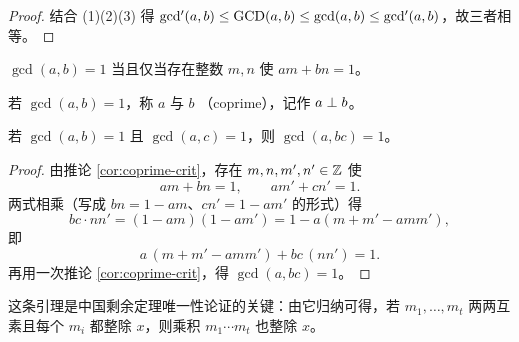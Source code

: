 \begin{proof}
结合 (1)(2)(3) 得
$\mathop{\mathrm{gcd'}}\nolimits(a,b)\le\mathrm{GCD}(a,b)\le\gcd(a,b)\le\mathop{\mathrm{gcd'}}\nolimits(a,b)$，故三者相等。
\end{proof}

\begin{corollary}[互素判据]\label{cor:coprime-crit}
$\gcd(a,b)=1$ 当且仅当存在整数 $m,n$ 使 $am+bn=1$。
\end{corollary}

\begin{definition}[互素]
若 $\gcd(a,b)=1$，称 $a$ 与 $b$ （coprime），记作 $a\perp b$。
\end{definition}

\begin{lemma}[互素的乘积封闭性]\label{lem:cop-product}
若 $\gcd(a,b)=1$ 且 $\gcd(a,c)=1$，则 $\gcd(a,bc)=1$。
\end{lemma}

\begin{proof}
由推论 \ref{cor:coprime-crit}，存在 $m,n,m',n'\in\mathbb{Z}$ 使
\[
  am+bn=1,\qquad am'+cn'=1.
\]
两式相乘（写成 $bn=1-am$、$cn'=1-am'$ 的形式）得
\[
  bc\cdot nn'=(1-am)(1-am')=1-a(m+m'-amm'),
\]
即
\[
  a\,(m+m'-amm')+bc\,(nn')=1.
\]
再用一次推论 \ref{cor:coprime-crit}，得 $\gcd(a,bc)=1$。
\end{proof}

\begin{remark}
这条引理是中国剩余定理唯一性论证的关键：由它归纳可得，若
$m_1,\ldots,m_t$ 两两互素且每个 $m_i$ 都整除 $x$，则乘积
$m_1\cdots m_t$ 也整除 $x$。
\end{remark}
